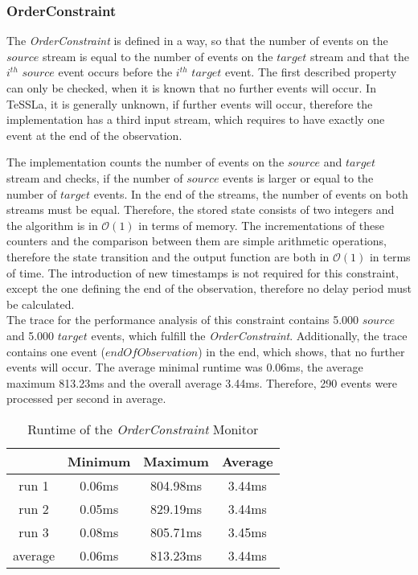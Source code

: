 \subsubsection{OrderConstraint}
	The \emph{OrderConstraint} is defined in a way, so that the number of events on the $source$ stream is equal to the number of events on the $target$ stream and that the $i^{th}$ $source$ event occurs before the  $i^{th}$ $target$ event. The first described property can only be checked, when it is known that no further events will occur. In TeSSLa, it is generally unknown, if further events will occur, therefore the implementation has a third input stream, which requires to have exactly one event at the end of the observation.
	
	The implementation counts the number of events on the $source$ and $target$ stream and checks, if the number of $source$ events is larger or equal to the number of $target$ events. In the end of the streams, the number of events on both streams must be equal. Therefore, the stored state consists of two integers and the algorithm is in $\mathcal{O}(1)$ in terms of memory. The incrementations of these counters and the comparison between them are simple arithmetic operations, therefore the state transition and the output function are both in $\mathcal{O}(1)$ in terms of time. The introduction of new timestamps is not required for this constraint, except the one defining the end of the observation, therefore no delay period must be calculated.\\
	The trace for the performance analysis of this constraint contains 5.000 $source$ and 5.000 $target$ events, which fulfill the \emph{OrderConstraint}. Additionally, the trace contains one event ($endOfObservation$) in the end, which shows, that no further events will occur. The average minimal runtime was 0.06ms, the average maximum 813.23ms and the overall average 3.44ms. Therefore, 290 events were processed per second in average.
	\begin{table}
		\begin{tabular}{|c|c|c|c|}
			\hline
					& Minimum & Maximum & Average \\
			\hline
			run 1	& 0.06ms & 804.98ms & 3.44ms\\
			\hline
			run 2	& 0.05ms & 829.19ms & 3.44ms\\
			\hline
			run 3	& 0.08ms & 805.71ms & 3.45ms\\
			\hline
			average & 0.06ms & 813.23ms & 3.44ms\\
			\hline
		\end{tabular}
		\centering
		\label{tab:runtimeOrderConstraint}
		\caption{Runtime of the \emph{OrderConstraint} Monitor}
	\end{table}
	
